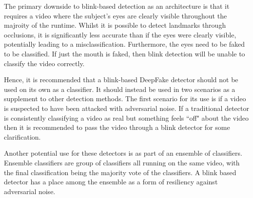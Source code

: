 The primary downside to blink-based detection as an architecture is that it requires a video where the subject's eyes are clearly visible throughout the majroity of the runtime. Whilst it is possible to detect landmarks through occlusions, it is significantly less accurate than if the eyes were clearly visible, potentially leading to a misclassification. Furthermore, the eyes need to be faked to be classified. If just the mouth is faked, then blink detection will be unable to classify the video correctly.

Hence, it is recommended that a blink-based DeepFake detector should not be used on its own as a classifier. It should instead be used in two scenarios as a supplement to other detection methods. The first scenario for its use is if a video is suspected to have been attacked with adversarial noise. If a traditional detector is consistently classifying a video as real but something feels ``off" about the video then it is recommended to pass the video through a blink detector for some clarification. 

Another potential use for these detectors is as part of an ensemble of classifiers. Ensemble classifiers are group of classifiers all running on the same video, with the final classification being the majority vote of the classifiers. A blink based detector has a place among the ensemble as a form of resiliency against adversarial noise.